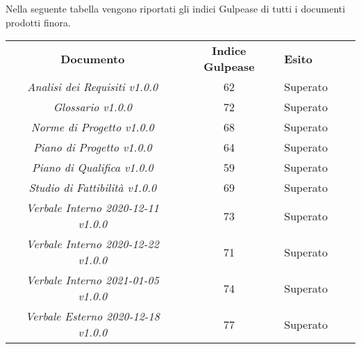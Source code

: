 Nella seguente tabella vengono riportati gli indici Gulpease\glo{} di tutti
i documenti prodotti finora.
\begin{table}[H]
    \caption{Tabella dell'indice di Gulpease}
\renewcommand{\arraystretch}{1.5}
\begin{longtable}{ c c  C{4cm}  c  c }
    \rowcolor{\primaryColor}
    \textcolor{\secondaryColor}{
    \centering\textbf{Documento}}     & \textcolor{\secondaryColor}{\centering\textbf{Indice Gulpease}}    & \textcolor{\secondaryColor}
    {\centering\textbf{Esito}} \\
    \textit{Analisi dei Requisiti v1.0.0}           & 62                                    & Superato{} \\
    \textit{Glossario v1.0.0}                       & 72                                    & Superato{} \\
    \textit{Norme di Progetto v1.0.0}               & 68                                   & Superato{} \\
    \textit{Piano di Progetto v1.0.0}                & 64                                    & Superato{} \\
    \textit{Piano di Qualifica v1.0.0}                & 59                                    & Superato{} \\
    \textit{Studio di Fattibilità v1.0.0}               & 69                                    & Superato{} \\
    \textit{Verbale Interno 2020-12-11 v1.0.0}          & 73                                    & Superato{} \\
    \textit{Verbale Interno 2020-12-22 v1.0.0}          & 71                                    & Superato{} \\
    \textit{Verbale Interno 2021-01-05 v1.0.0}          & 74                                    & Superato{} \\
    \textit{Verbale Esterno 2020-12-18 v1.0.0}          & 77                                    & Superato{} \\
\end{longtable}
\end{table}



